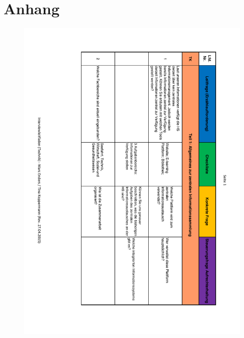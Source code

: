 \chapter*{Anhang}
\setcounter{chapter}{10}


\begin{figure}
	\centering
	\includegraphics[width=18cm]{kapitel/anhang/Interviewleitfaden_1}
\end{figure}

